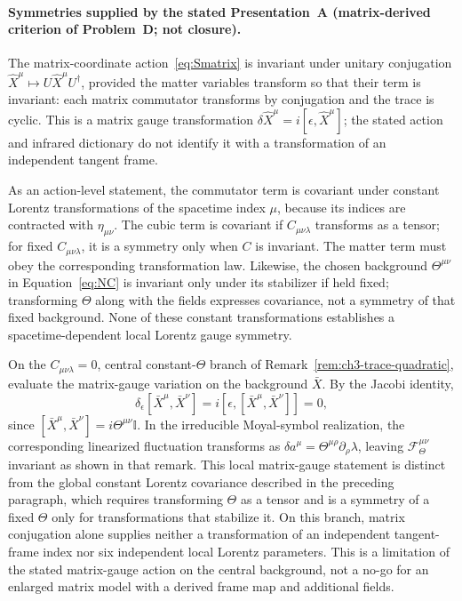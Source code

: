 \paragraph{Symmetries supplied by the stated Presentation~A
(matrix-derived criterion of Problem~D; not closure).}
The matrix-coordinate action~\eqref{eq:Smatrix} is invariant under
unitary conjugation
\(\hat X^\mu\mapsto U\hat X^\mu U^\dagger\), provided the matter
variables transform so that their term is invariant: each matrix
commutator transforms by conjugation and the trace is cyclic. This
is a matrix gauge transformation
\(\delta\hat X^\mu=i[\epsilon,\hat X^\mu]\); the stated action and
infrared dictionary do not identify it with a transformation of an
independent tangent frame.

As an action-level statement, the commutator term is covariant under
constant Lorentz transformations of the spacetime index \(\mu\),
because its indices are contracted with \(\eta_{\mu\nu}\). The cubic
term is covariant if \(C_{\mu\nu\lambda}\) transforms as a tensor;
for fixed \(C_{\mu\nu\lambda}\), it is a symmetry only when \(C\) is
invariant. The matter term must obey the corresponding transformation
law. Likewise, the chosen background \(\Theta^{\mu\nu}\) in
Equation~\eqref{eq:NC} is invariant only under its stabilizer if held
fixed; transforming \(\Theta\) along with the fields expresses
covariance, not a symmetry of that fixed background. None of these
constant transformations establishes a spacetime-dependent local
Lorentz gauge symmetry.

On the \(C_{\mu\nu\lambda}=0\), central constant-\(\Theta\) branch of
Remark~\ref{rem:ch3-trace-quadratic}, evaluate the matrix-gauge variation
on the background \(\bar X\). By the Jacobi identity,
\[
  \delta_\epsilon[\bar X^\mu,\bar X^\nu]
  =i[\epsilon,[\bar X^\mu,\bar X^\nu]]=0,
\]
since \([\bar X^\mu,\bar X^\nu]=i\Theta^{\mu\nu}\mathbb I\). In the
irreducible Moyal-symbol realization, the corresponding linearized
fluctuation transforms as
\(\delta a^\mu=\Theta^{\mu\rho}\partial_\rho\lambda\), leaving
\(\mathcal F_\Theta^{\mu\nu}\) invariant as shown in that remark. This
local matrix-gauge statement is distinct from the global constant
Lorentz covariance described in the preceding paragraph, which requires
transforming \(\Theta\) as a tensor and is a symmetry of a fixed
\(\Theta\) only for transformations that stabilize it. On this branch,
matrix conjugation alone supplies neither a transformation of an
independent tangent-frame index nor six independent local Lorentz
parameters. This is a limitation of the stated matrix-gauge action on
the central background, not a no-go for an enlarged matrix model with a
derived frame map and additional fields.


